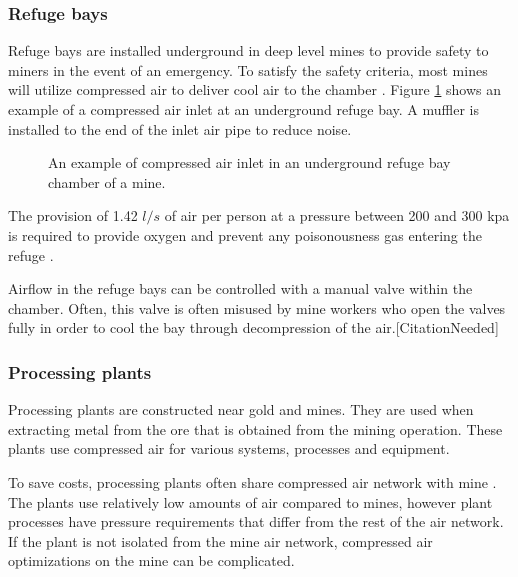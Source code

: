 			\subsubsection{Refuge bays}
				Refuge bays are installed underground in deep level mines to provide safety to miners in the event of an emergency. To satisfy the safety criteria, most mines will utilize compressed air to deliver cool air to the chamber \cite{brake1999criteria}. Figure \ref{fig: Refuge Bay} shows an example of a compressed air inlet at an underground refuge bay. A muffler is installed to the end of the inlet air pipe to reduce noise.
				\begin{figure}[h]
					\centering
					\caption{An example of compressed air inlet in an underground refuge bay chamber of a mine.}
					\label{fig: Refuge Bay}
				\end{figure}
				\par The provision of 1.42 $l/s$ of air per person at a pressure between 200 and 300 \gls{kpa} is required to provide oxygen and prevent any poisonousness gas entering the refuge \cite{brake1999criteria}.\par
				Airflow in the refuge bays can be controlled with a manual valve within the chamber. Often, this valve is often misused by mine workers who open the valves fully in order to cool the bay through decompression of the air.[CitationNeeded]
			\subsubsection{Processing plants}
				Processing plants are constructed near gold and mines. They are used when extracting metal from the ore that is obtained from the mining operation. These plants use compressed air for various systems, processes and equipment. 
				\par 
				To save costs, processing plants often share compressed air network with mine \cite{Marais2012PhD}. The plants use relatively low amounts of air compared to mines, however plant processes have pressure requirements that differ from the rest of the air network. If the plant is not isolated from the mine air network, compressed air optimizations on the mine can be complicated. 
